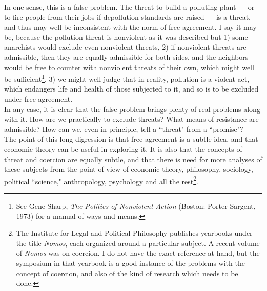 In one sense, this is a false problem. The threat to build a polluting plant --- or to fire people from their jobs if depollution standards are raised --- is a threat, and thus may well be inconsistent with the norm of free agreement. I say it may be, because the pollution threat is nonviolent as it was described but 1) some anarchists would exclude even nonviolent threats, 2) if nonviolent threats are admissible, then they are equally admissible for both sides, and the neighbors would be free to counter with nonviolent threats of their own, which might well be sufficient\footnote{See Gene Sharp, \emph{The Politics of Nonviolent Action} (Boston: Porter Sargent, 1973) for a manual of ways and means.}, 3) we might well judge that in reality, pollution is a violent act, which endangers life and health of those subjected to it, and so is to be excluded under free agreement.\\
In any case, it is clear that the false problem brings plenty of real problems along with it. How are we practically to exclude threats? What means of resistance are admissible? How can we, even in principle, tell a ``threat" from a ``promise"?\\
The point of this long digression is that free agreement is a subtle idea, and that economic theory can be useful in exploring it. It is also that the concepts of threat and coercion are equally subtle, and that there is need for more analyses of these subjects from the point of view of economic theory, philosophy, sociology, political ``science," anthropology, psychology and all the rest\footnote{The Institute for Legal and Political Philosophy publishes yearbooks under the title \emph{Nomos}, each organized around a particular subject. A recent volume of \emph{Nomos} was on coercion. I do not have the exact reference at hand, but the symposium in that yearbook is a good instance of the problems with the concept of coercion, and also of the kind of research which needs to be done.}.\\

